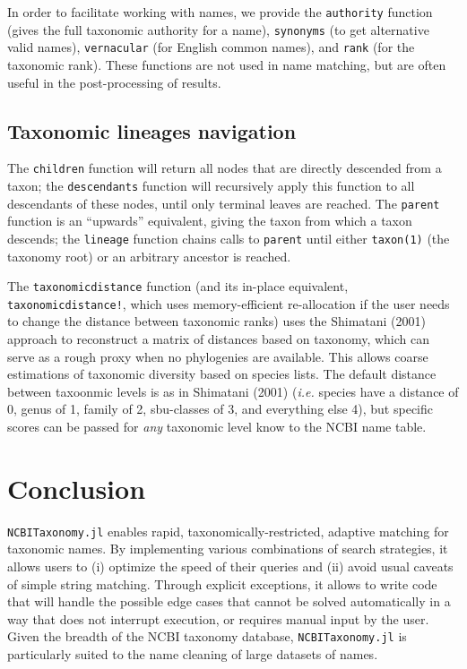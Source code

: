 \documentclass[11pt]{article}
\begin{document}
In order to facilitate working with names, we provide the
\texttt{authority} function (gives the full taxonomic authority for a
name), \texttt{synonyms} (to get alternative valid names),
\texttt{vernacular} (for English common names), and \texttt{rank} (for
the taxonomic rank). These functions are not used in name matching, but
are often useful in the post-processing of results.

\hypertarget{taxonomic-lineages-navigation}{%
\subsection{Taxonomic lineages
navigation}\label{taxonomic-lineages-navigation}}

The \texttt{children} function will return all nodes that are directly
descended from a taxon; the \texttt{descendants} function will
recursively apply this function to all descendants of these nodes, until
only terminal leaves are reached. The \texttt{parent} function is an
``upwards'' equivalent, giving the taxon from which a taxon descends;
the \texttt{lineage} function chains calls to \texttt{parent} until
either \texttt{taxon(1)} (the taxonomy root) or an arbitrary ancestor is
reached.

The \texttt{taxonomicdistance} function (and its in-place equivalent,
\texttt{taxonomicdistance!}, which uses memory-efficient re-allocation
if the user needs to change the distance between taxonomic ranks) uses
the Shimatani (2001) approach to reconstruct a matrix of distances based
on taxonomy, which can serve as a rough proxy when no phylogenies are
available. This allows coarse estimations of taxonomic diversity based
on species lists. The default distance between taxoonmic levels is as in
Shimatani (2001) (\emph{i.e.} species have a distance of 0, genus of 1,
family of 2, sbu-classes of 3, and everything else 4), but specific
scores can be passed for \emph{any} taxonomic level know to the NCBI
name table.

\hypertarget{conclusion}{%
\section{Conclusion}\label{conclusion}}

\texttt{NCBITaxonomy.jl} enables rapid, taxonomically-restricted,
adaptive matching for taxonomic names. By implementing various
combinations of search strategies, it allows users to (i) optimize the
speed of their queries and (ii) avoid usual caveats of simple string
matching. Through explicit exceptions, it allows to write code that will
handle the possible edge cases that cannot be solved automatically in a
way that does not interrupt execution, or requires manual input by the
user. Given the breadth of the NCBI taxonomy database,
\texttt{NCBITaxonomy.jl} is particularly suited to the name cleaning of
large datasets of names.
\end{document}
